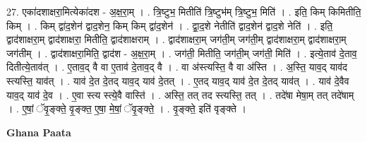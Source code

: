 \documentclass[17pt]{extarticle}
\begin{document}
27. एका॑दशाक्षरा॒मित्येका॑दश - अ॒क्ष॒रा॒म् । . त्रि॒ष्टुभ॒ मितीति॑ त्रि॒ष्टुभ॑म् त्रि॒ष्टुभ॒ मिति॑ । . इति॒ किम् किमितीति॒ किम् । . किम् द्वा॑द॒शेन॑ द्वाद॒शेन॒ किम् किम् द्वा॑द॒शेन॑ । . द्वा॒द॒शे नेतीति॑ द्वाद॒शेन॑ द्वाद॒शे नेति॑ । . इति॒ द्वाद॑शाक्षरा॒म् द्वाद॑शाक्षरा॒ मितीति॒ द्वाद॑शाक्षराम् । . द्वाद॑शाक्षरा॒म् जग॑ती॒म् जग॑ती॒म् द्वाद॑शाक्षरा॒म् द्वाद॑शाक्षरा॒म् जग॑तीम् । . द्वाद॑शाक्षरा॒मिति॒ द्वाद॑श - अ॒क्ष॒रा॒म् । . जग॑ती॒ मितीति॒ जग॑ती॒म् जग॑ती॒ मिति॑ । . इत्ये॒ताव॑ दे॒ताव॒ दितीत्ये॒ताव॑त् । . ए॒ताव॒द् वै वा ए॒ताव॑ दे॒ताव॒द् वै । . वा अ॑स्त्यस्ति॒ वै वा अ॑स्ति । . अ॒स्ति॒ याव॒द् याव॑द स्त्यस्ति॒ याव॑त् । . याव॑ दे॒त दे॒तद् याव॒द् याव॑ दे॒तत् । . ए॒तद् याव॒द् याव॑ दे॒त दे॒तद् याव॑त् । . याव॑ दे॒वैव याव॒द् याव॑ दे॒व । . ए॒वा स्त्य स्त्ये॒वै वास्ति॑ । . अस्ति॒ तत् तद स्त्यस्ति॒ तत् । . तदे॑षा मेषा॒म् तत् तदे॑षाम् । . ए॒षां॒ ॅवृ॒ङ्क्ते॒ वृ॒ङ्क्त॒ ए॒षा॒ मे॒षां॒ ॅवृ॒ङ्क्ते॒ । . वृ॒ङ्‍क्ते॒ इति॑ वृङ्‍क्ते । \newline

\textbf{Ghana Paata } \newline
\end{document}
